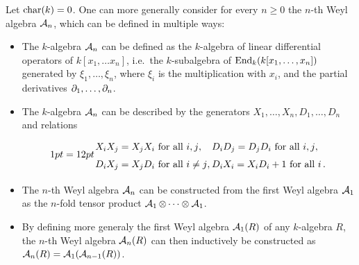 \begin{remark}
  Let $\operatorname{char}(k) = 0$.
  One can more generally consider for every $n \geq 0$ the $n$-th Weyl algebra $\operatorname{\mathcal{A}}_n$, which can be defined in multiple ways:
  \begin{itemize}
    \item
      The $k$-algebra $\operatorname{\mathcal{A}}_n$ can be defined as the $k$-algebra of linear differential operators of $k[x_1, \dotsc x_n]$, i.e.\ the $k$-subalgebra of $\operatorname{End}_k(k[x_1, \dotsc, x_n])$ generated by $\xi_1, \dotsc, \xi_n$, where $\xi_i$ is the multiplication with $x_i$, and the partial derivatives $\partial_1, \dotsc, \partial_n$.
    \item
      The $k$-algebra $\operatorname{\mathcal{A}}_n$ can be described by the generators $X_1, \dotsc, X_n, D_1, \dotsc, D_n$ and relations
      \[
        \begingroup
        \arraycolsep = 12pt
        \renewcommand{\arraystretch}{1.5}
        \begin{array}{ll}
            \text{$X_i X_j = X_j X_i$ for all $i,j$},
          & \text{$D_i D_j = D_j D_i$ for all $i, j$},
          \\
            \text{$D_i X_j = X_j D_i$ for all $i \neq j$},
          & \text{$D_i X_i = X_i D_i + 1$ for all $i$} \,.
        \end{array}
        \endgroup
      \]
    \item
      The $n$-th Weyl algebra $\operatorname{\mathcal{A}}_n$ can be constructed from the first Weyl algebra $\operatorname{\mathcal{A}}_1$ as the $n$-fold tensor product $\operatorname{\mathcal{A}}_1 \mathbin{\otimes} \dotsb \mathbin{\otimes} \operatorname{\mathcal{A}}_1$.
    \item
      By defining more generaly the first Weyl algebra $\operatorname{\mathcal{A}}_1(R)$ of any $k$-algebra $R$, the $n$-th Weyl algebra $\operatorname{\mathcal{A}}_n(R)$ can then inductively be constructed as $\operatorname{\mathcal{A}}_n(R) = \operatorname{\mathcal{A}}_1(\operatorname{\mathcal{A}}_{n-1}(R))$.
  \end{itemize}
\end{remark}




